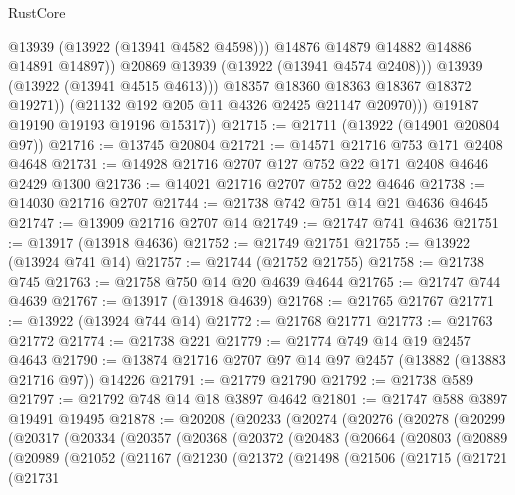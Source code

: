 \begin{lexlean}{RustCore}
\begin{coremodule}
                          @13939
                          (@13922 (@13941 @4582 @4598)))
                        @14876
                        @14879
                        @14882
                        @14886
                        @14891
                        @14897))
                    @20869
                    @13939
                    (@13922 (@13941 @4574 @2408)))
                  @13939
                  (@13922 (@13941 @4515 @4613)))
                @18357
                @18360
                @18363
                @18367
                @18372
                @19271))
            (@21132 @192 @205 @11 @4326 @2425 @21147 @20970)))
        @19187
        @19190
        @19193
        @19196
        @15317))
@21715 := @21711 (@13922 (@14901 @20804 @97))
@21716 := @13745 @20804
@21721 := @14571 @21716 @753 @171 @2408 @4648
@21731 := @14928 @21716 @2707 @127 @752 @22 @171 @2408 @4646 @2429 @1300
@21736 := @14021 @21716 @2707 @752 @22 @4646
@21738 := @14030 @21716 @2707
@21744 := @21738 @742 @751 @14 @21 @4636 @4645
@21747 := @13909 @21716 @2707 @14
@21749 := @21747 @741 @4636
@21751 := @13917 (@13918 @4636)
@21752 := @21749 @21751
@21755 := @13922 (@13924 @741 @14)
@21757 := @21744 (@21752 @21755)
@21758 := @21738 @745
@21763 := @21758 @750 @14 @20 @4639 @4644
@21765 := @21747 @744 @4639
@21767 := @13917 (@13918 @4639)
@21768 := @21765 @21767
@21771 := @13922 (@13924 @744 @14)
@21772 := @21768 @21771
@21773 := @21763 @21772
@21774 := @21738 @221
@21779 := @21774 @749 @14 @19 @2457 @4643
@21790 := @13874 @21716 @2707 @97 @14 @97 @2457 (@13882 (@13883 @21716 @97)) @14226
@21791 := @21779 @21790
@21792 := @21738 @589
@21797 := @21792 @748 @14 @18 @3897 @4642
@21801 := @21747 @588 @3897 @19491 @19495
@21878 := @20208
    (@20233
      (@20274
        (@20276
          (@20278
            (@20299
              (@20317
                (@20334
                  (@20357
                    (@20368
                      (@20372
                        (@20483
                          (@20664
                            (@20803
                              (@20889
                                (@20989
                                  (@21052
                                    (@21167
                                      (@21230
                                        (@21372
                                          (@21498
                                            (@21506
                                              (@21715
                                                (@21721
                                                  (@21731

\end{coremodule}
\end{lexlean}
